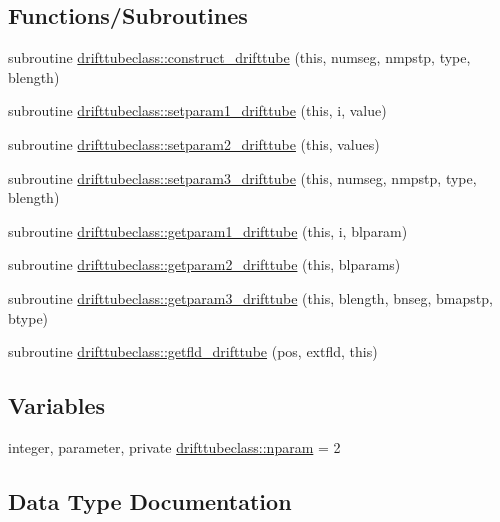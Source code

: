 \subsection*{Functions/\+Subroutines}
\begin{DoxyCompactItemize}
\item 
subroutine \mbox{\hyperlink{namespacedrifttubeclass_a322f55e58fbe6fb5e4ed93cd126e5ede}{drifttubeclass\+::construct\+\_\+drifttube}} (this, numseg, nmpstp, type, blength)
\item 
subroutine \mbox{\hyperlink{namespacedrifttubeclass_ae2e1974821a810c5d65afd4546b1a690}{drifttubeclass\+::setparam1\+\_\+drifttube}} (this, i, value)
\item 
subroutine \mbox{\hyperlink{namespacedrifttubeclass_a3883fd9688d0b98e279f57547de67b8c}{drifttubeclass\+::setparam2\+\_\+drifttube}} (this, values)
\item 
subroutine \mbox{\hyperlink{namespacedrifttubeclass_a5c05a55ca0f98570b2b02f3c84181015}{drifttubeclass\+::setparam3\+\_\+drifttube}} (this, numseg, nmpstp, type, blength)
\item 
subroutine \mbox{\hyperlink{namespacedrifttubeclass_ade5fb645fa735d4743cd431024727261}{drifttubeclass\+::getparam1\+\_\+drifttube}} (this, i, blparam)
\item 
subroutine \mbox{\hyperlink{namespacedrifttubeclass_af16030dcb46192b3748c28ceb1ca7d4f}{drifttubeclass\+::getparam2\+\_\+drifttube}} (this, blparams)
\item 
subroutine \mbox{\hyperlink{namespacedrifttubeclass_a4dc53dfc73175d3eb0d420c6cb9d64f8}{drifttubeclass\+::getparam3\+\_\+drifttube}} (this, blength, bnseg, bmapstp, btype)
\item 
subroutine \mbox{\hyperlink{namespacedrifttubeclass_aa903101ae6943402917a2f29a8aa67d3}{drifttubeclass\+::getfld\+\_\+drifttube}} (pos, extfld, this)
\end{DoxyCompactItemize}
\subsection*{Variables}
\begin{DoxyCompactItemize}
\item 
integer, parameter, private \mbox{\hyperlink{namespacedrifttubeclass_af382d7cef81496c1d2c2bf3ba72c4350}{drifttubeclass\+::nparam}} = 2
\end{DoxyCompactItemize}


\subsection{Data Type Documentation}
\label{structdrifttubeclass_1_1drifttube}

